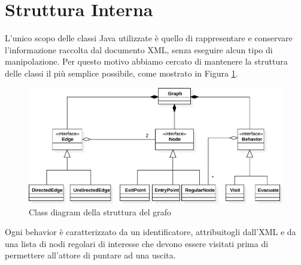 \section{Struttura Interna}
L'unico scopo delle classi Java utilizzate è quello di rappresentare e conservare l'informazione raccolta dal documento XML, senza eseguire alcun tipo di manipolazione. Per questo motivo abbiamo cercato di mantenere la struttura delle classi il più semplice possibile, come mostrato in Figura \ref{fig:graph-diagram}.\\
\begin{figure}[htbp]
\centering
\includegraphics[width=\textwidth,height=\textheight,keepaspectratio]{images/graph-diagram.pdf}
\caption{Class diagram della struttura del grafo}
\label{fig:graph-diagram}
\end{figure}
Ogni behavior è caratterizzato da un identificatore, attribuitogli dall'XML e da una lista di nodi regolari di interesse che devono essere visitati prima di permettere all'attore di puntare ad una uscita. 

